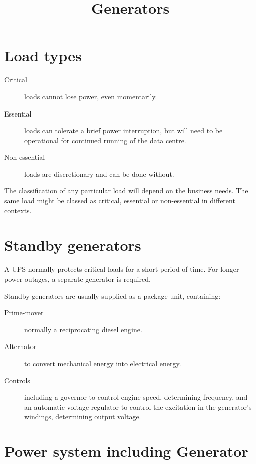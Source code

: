 \documentclass{pgnotes}
\title{Generators}
\begin{document}
\maketitle

\section{Load types}

\begin{description}
\item[Critical] loads cannot lose power, even momentarily.
\item[Essential] loads can tolerate a brief power interruption, but will need to be operational for continued running of the data centre.
\item[Non-essential] loads are discretionary and can be done without. 
\end{description}

The classification of any particular load will depend on the business needs.
The same load might be classed as critical, essential or non-essential in different contexts.

\section{Standby generators}

A UPS normally protects critical loads for a short period of time.
For longer power outages, a separate generator is required.

Standby generators are usually supplied as a package unit, containing:
\begin{description}
\item[Prime-mover] normally a reciprocating diesel engine.
\item[Alternator] to convert mechanical energy into electrical energy.
\item[Controls] including a governor to control engine speed, determining frequency, and an automatic voltage regulator to control the excitation in the generator's windings, determining output voltage.
\end{description}


\section{Power system including Generator}
\end{document}
